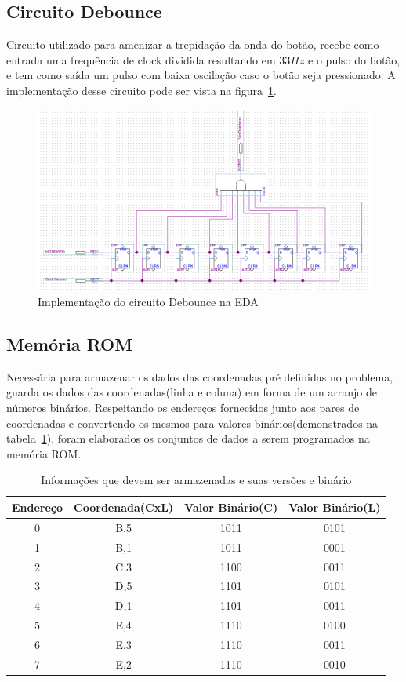 \documentclass[12pt]{article}
\begin{document}
\subsection{Circuito Debounce}
Circuito utilizado para amenizar a trepidação da onda do botão, recebe como entrada uma frequência de clock dividida resultando em 33$Hz$ e o pulso do botão, e tem como saída um pulso com baixa oscilação caso o botão seja pressionado. A implementação desse circuito pode ser vista na figura~\ref{fig:debounce}.

\begin{figure}[!htbp]
\centering
\includegraphics[width=.7\textwidth]{img/debounce.png}
\caption{Implementação do circuito Debounce na EDA}
\label{fig:debounce}
\end{figure}


\subsection{Memória ROM}

Necessária para armazenar os dados das coordenadas pré definidas no problema, guarda os dados das coordenadas(linha e coluna) em forma de um arranjo de números binários. Respeitando os endereços fornecidos junto aos pares de coordenadas e convertendo os mesmos para valores binários(demonstrados na tabela~\ref{tab:rom-memory}), foram elaborados os conjuntos de dados a serem programados na memória ROM.

\begin{table}[!htbp]
\centering
\begin{tabular}{||c||c||c||c||}
\hline 
\rule[-1ex]{0pt}{2.5ex} Endereço & Coordenada(CxL) & Valor Binário(C) & Valor Binário(L) \\ 
\hline 
\hline
\rule[-1ex]{0pt}{2.5ex} 0 & B,5 & 1011 & 0101 \\ 
\hline 
\rule[-1ex]{0pt}{2.5ex} 1 & B,1 & 1011 & 0001 \\ 
\hline 
\rule[-1ex]{0pt}{2.5ex} 2 & C,3 & 1100 & 0011 \\ 
\hline 
\rule[-1ex]{0pt}{2.5ex} 3 & D,5 & 1101 & 0101 \\ 
\hline 
\rule[-1ex]{0pt}{2.5ex} 4 & D,1 & 1101 & 0011 \\ 
\hline 
\rule[-1ex]{0pt}{2.5ex} 5 & E,4 & 1110 & 0100 \\ 
\hline 
\rule[-1ex]{0pt}{2.5ex} 6 & E,3 & 1110 & 0011 \\ 
\hline 
\rule[-1ex]{0pt}{2.5ex} 7 & E,2 & 1110 & 0010 \\ 
\hline 
\end{tabular} 
\caption{Informações que devem ser armazenadas e suas versões e binário}
\label{tab:rom-memory}
\end{table}
\end{document}
